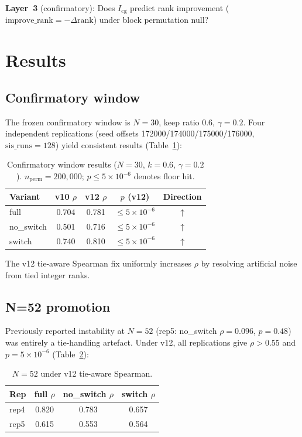 \documentclass[12pt,a4paper]{article}
\newcommand{\Icg}{I_{\mathrm{cg}}}
\begin{document}
\textbf{Layer~3} (confirmatory): Does $\Icg$ predict rank improvement
($\text{improve\_rank} = -\Delta\text{rank}$) under block permutation null?

\section{Results}

\subsection{Confirmatory window}

The frozen confirmatory window is $N=30$, keep ratio $0.6$, $\gamma=0.2$.
Four independent replications (seed offsets 172000/174000/175000/176000,
$\text{sis\_runs}=128$) yield consistent results (Table~\ref{tab:d_frozen}):

\begin{table}[h]
\centering
\caption{Confirmatory window results ($N=30$, $k=0.6$, $\gamma=0.2$).
$n_{\mathrm{perm}}=200{,}000$; $p\leq 5\times 10^{-6}$ denotes floor hit.}
\label{tab:d_frozen}
\begin{tabular}{lcccc}
\toprule
Variant & v10 $\rho$ & v12 $\rho$ & $p$ (v12) & Direction \\
\midrule
full       & 0.704 & 0.781 & $\leq 5\times 10^{-6}$ & $\uparrow$ \\
no\_switch & 0.501 & 0.716 & $\leq 5\times 10^{-6}$ & $\uparrow$ \\
switch     & 0.740 & 0.810 & $\leq 5\times 10^{-6}$ & $\uparrow$ \\
\bottomrule
\end{tabular}
\end{table}

The v12 tie-aware Spearman fix uniformly increases $\rho$ by resolving
artificial noise from tied integer ranks.

\subsection{N=52 promotion}

Previously reported instability at $N=52$ (rep5: no\_switch $\rho=0.096$,
$p=0.48$) was entirely a tie-handling artefact.
Under v12, all replications give $\rho>0.55$ and $p=5\times 10^{-6}$
(Table~\ref{tab:d_n52}):

\begin{table}[h]
\centering
\caption{$N=52$ under v12 tie-aware Spearman.}
\label{tab:d_n52}
\begin{tabular}{lccc}
\toprule
Rep & full $\rho$ & no\_switch $\rho$ & switch $\rho$ \\
\midrule
rep4 & 0.820 & 0.783 & 0.657 \\
rep5 & 0.615 & 0.553 & 0.564 \\
\bottomrule
\end{tabular}
\end{table}
\end{document}
